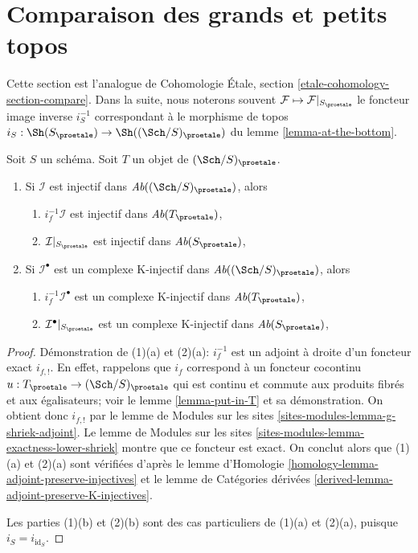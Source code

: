 \section{Comparaison des grands et petits topos}
\label{section-compare}

\noindent
Cette section est l'analogue de Cohomologie \'Etale, section
\ref{etale-cohomology-section-compare}. Dans la suite, nous
noterons souvent $\mathcal{F} \mapsto \mathcal{F}|_{S_\proetale}$
le foncteur image inverse $i_S^{-1}$ correspondant à
le morphisme de topos $i_S : \Sh(S_\proetale) \to \Sh((\Sch/S)_\proetale)$
du lemme \ref{lemma-at-the-bottom}.

\begin{lemma}
\label{lemma-compare-injectives}
Soit $S$ un schéma. Soit $T$ un objet de $(\Sch/S)_\proetale$.
\begin{enumerate}
\item Si $\mathcal{I}$ est injectif dans $\textit{Ab}((\Sch/S)_\proetale)$, alors
\begin{enumerate}
\item $i_f^{-1}\mathcal{I}$ est injectif dans $\textit{Ab}(T_\proetale)$,
\item $\mathcal{I}|_{S_\proetale}$ est injectif dans $\textit{Ab}(S_\proetale)$,
\end{enumerate}
\item Si $\mathcal{I}^\bullet$ est un complexe K-injectif
dans $\textit{Ab}((\Sch/S)_\proetale)$, alors
\begin{enumerate}
\item $i_f^{-1}\mathcal{I}^\bullet$ est un complexe K-injectif dans
$\textit{Ab}(T_\proetale)$,
\item $\mathcal{I}^\bullet|_{S_\proetale}$ est un complexe K-injectif dans
$\textit{Ab}(S_\proetale)$,
\end{enumerate}
\end{enumerate}
\end{lemma}

\begin{proof}
Démonstration de (1)(a) et (2)(a): $i_f^{-1}$ est un adjoint à droite d'un
foncteur exact $i_{f, !}$. En effet, rappelons que $i_f$ correspond
à un foncteur cocontinu $u : T_\proetale \to (\Sch/S)_\proetale$
qui est continu et commute aux produits fibrés et aux égalisateurs; voir le
lemme \ref{lemma-put-in-T} et sa démonstration. On obtient donc $i_{f, !}$ par le
lemme de Modules sur les sites \ref{sites-modules-lemma-g-shriek-adjoint}.
Le lemme de Modules sur les sites
\ref{sites-modules-lemma-exactness-lower-shriek} montre que ce foncteur est exact.
On conclut alors que (1)(a) et (2)(a) sont vérifiées d'après le
lemme d'Homologie \ref{homology-lemma-adjoint-preserve-injectives} et le
lemme de Catégories dérivées \ref{derived-lemma-adjoint-preserve-K-injectives}.

\medskip\noindent
Les parties (1)(b) et (2)(b) sont des cas particuliers de (1)(a) et (2)(a),
puisque $i_S = i_{\text{id}_S}$.
\end{proof}

